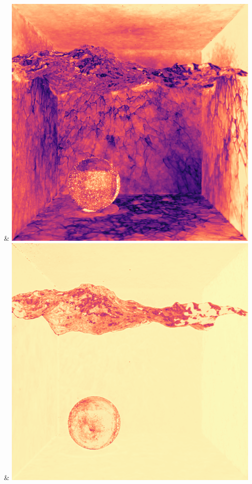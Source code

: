 & \includegraphics[width=\linewidth]{figures/py/tests/quality_comparison/nrc+naive_1spp_caustics_small_flip.png}
& \includegraphics[width=\linewidth]{figures/py/tests/quality_comparison/nrc+naive+bal_1spp_caustics_small_flip.png}
